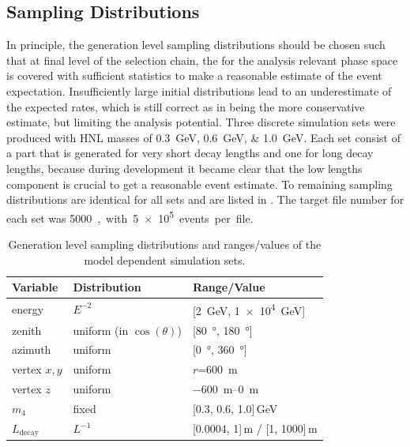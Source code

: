 \subsection{Sampling Distributions}

In principle, the generation level sampling distributions should be chosen such that at final level of the selection chain, the for the analysis relevant phase space is covered with sufficient statistics to make a reasonable estimate of the event expectation. Insufficiently large initial distributions lead to an underestimate of the expected rates, which is still correct as in being the more conservative estimate, but limiting the analysis potential. Three discrete simulation sets were produced with HNL masses of \SIlist{0.3;0.6;1.0}{\GeV}. Each set consist of a part that is generated for very short decay lengths and one for long decay lengths, because during development it became clear that the low lengths component is crucial to get a reasonable event estimate. To remaining sampling distributions are identical for all sets and are listed in . The target file number for each set was \SI{5000}, with \SI{5e5} events per file.

\begin{table}[h]
    \centering
    \begin{tabular} { lll }
        \hline \hline 
        \textbf{Variable} & \textbf{Distribution} & \textbf{Range/Value} \\
        \hline \hline 
        energy & $E^{-2}$ & [\SI{2}{\GeV}, \SI{1e4}{\GeV}] \\
        zenith & uniform (in $\cos(\theta)$) & [\SI{80}{\degree}, \SI{180}{\degree}] \\
        azimuth & uniform & [\SI{0}{\degree}, \SI{360}{\degree}] \\
        vertex $x,y$ & uniform & $r$=\SI{600}{\metre} \\
        vertex $z$ & uniform & \SIrange{-600}{0}{\metre} \\
        $m_\mathrm{4}$ & fixed & [0.3, 0.6, 1.0]\,\si{\GeV} \\
        $L_\mathrm{decay}$ & $L^{-1}$ & [0.0004, 1]\,\si{\metre} / [1, 1000]\,\si{\metre} \\
        \hline
    \end{tabular}
    \caption[Model dependent simulation sampling distributions]{Generation level sampling distributions and ranges/values of the model dependent simulation sets.}
\end{table}


